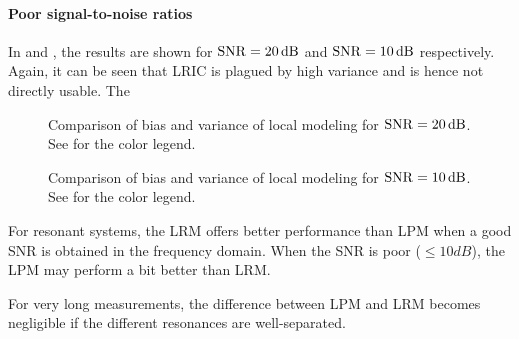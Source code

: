 \paragraph{Poor signal-to-noise ratios}
In  and , the results are shown for $\SNR=20\unit{dB}$ and $\SNR=10\unit{dB}$ respectively.
Again, it can be seen that \gls{LRIC} is plagued by high variance and is hence not directly usable.
The

\begin{figure}[phtb]
  \centering
  \setlength{\figurewidth}{0.85\columnwidth}
  \setlength{\figureheight}{0.62\figurewidth}
  
  \caption[Comparison of local models for $\SNR = 20 \unit{dB}$]{Comparison of bias and variance of local modeling for $\SNR=20\unit{dB}$. See  for the color legend.}
  \label{fig:nparam:comparison:lowSNR}
\end{figure}

\begin{figure}[phbt]
  \centering
  \setlength{\figurewidth}{0.85\columnwidth}
  \setlength{\figureheight}{0.62\figurewidth}
  
 \caption[Comparison of local models for $\SNR = 10 \unit{dB}$]{Comparison of bias and variance of local modeling for $\SNR=10\unit{dB}$. See  for the color legend.}
  \label{fig:nparam:comparison:terribleSNR}
\end{figure}

\begin{guideline}
For resonant systems, the \gls{LRM} offers better performance than \gls{LPM} when a good \gls{SNR} is obtained in the frequency domain.
When the \gls{SNR} is poor ($\leq 10\unit{dB}$), the \gls{LPM} may perform a bit better than \gls{LRM}.
\end{guideline}

\begin{guideline}
For very long measurements, the difference between \gls{LPM} and \gls{LRM} becomes negligible if the different resonances are well-separated.
\end{guideline}


